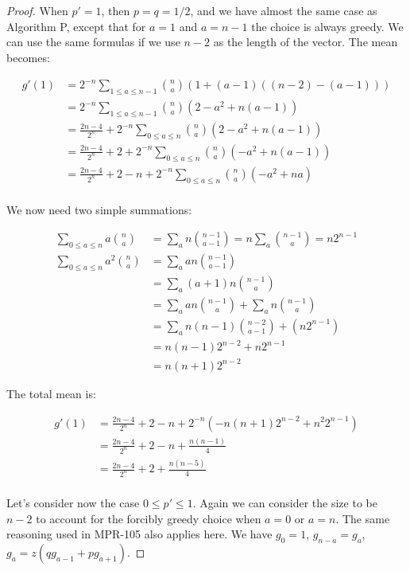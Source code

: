 \documentclass[10pt]{book}
\begin{document}
\begin{proof}
When $p'=1$, then $p=q=1/2$, and we have almost the same case as Algorithm P, except that for $a=1$ and $a=n-1$ the choice is always greedy. We can use the same formulas if we use $n-2$ as the length of the vector. The mean becomes:

\begin{align*}
  g'(1) &= 2^{-n}\sum_{1\le a\le n-1}{n\choose a}(1+(a-1)((n-2)-(a-1)))\\
   &= 2^{-n}\sum_{1\le a\le n-1}{n\choose a}(2-a^2+n(a-1))\\
   &= \frac{2n-4}{2^n}+2^{-n}\sum_{0\le a\le n}{n\choose a}(2-a^2+n(a-1))\\
   &= \frac{2n-4}{2^n}+2+2^{-n}\sum_{0\le a\le n}{n\choose a}(-a^2+n(a-1))\\
   &= \frac{2n-4}{2^n}+2-n+2^{-n}\sum_{0\le a\le n}{n\choose a}(-a^2+na)\\
\end{align*}

We now need two simple summations:

\begin{align*}
  \sum_{0\le a\le n}a{n\choose a} &= \sum_a n{n-1\choose a-1}
  =n\sum_a {n-1\choose a}=n 2^{n-1} \\
  \sum_{0\le a\le n}a^2{n\choose a} &= \sum_a a n{n-1\choose a-1} \\
  &=\sum_a (a+1) n{n-1\choose a}\\
  &= \sum_a an{n-1\choose a}+\sum_a n{n-1\choose a}\\
  &= \sum_a n(n-1){n-2\choose a-1}+(n 2 ^{n-1})\\
  &= n(n-1)2 ^{n-2}+n2 ^{n-1}\\
  &= n(n+1)2^{n-2}
\end{align*}

The total mean is:

\begin{align*}
   g'(1) &= \frac{2n-4}{2^n}+2-n+
  2^{-n}  \left( -n(n+1)2^{n-2} +n^2 2^{n-1} \right) \\
  &= \frac{2n-4}{2^n}+2-n+\frac{n(n-1)}{4}\\
  &= \frac{2n-4}{2^n}+2+\frac{n(n-5)}{4}\\
\end{align*}

Let's consider now the case $0\le p'\le 1$. Again we can consider the size to be $n-2$ to account for the forcibly greedy choice when $a=0$ or $a=n$. The same reasoning used in MPR-105 also applies here. We have $g_0=1$, $g_{n-a}=g_a$, $g_a=z(qg_{a-1}+pg_{a+1})$. 


\end{proof}
\end{document}
